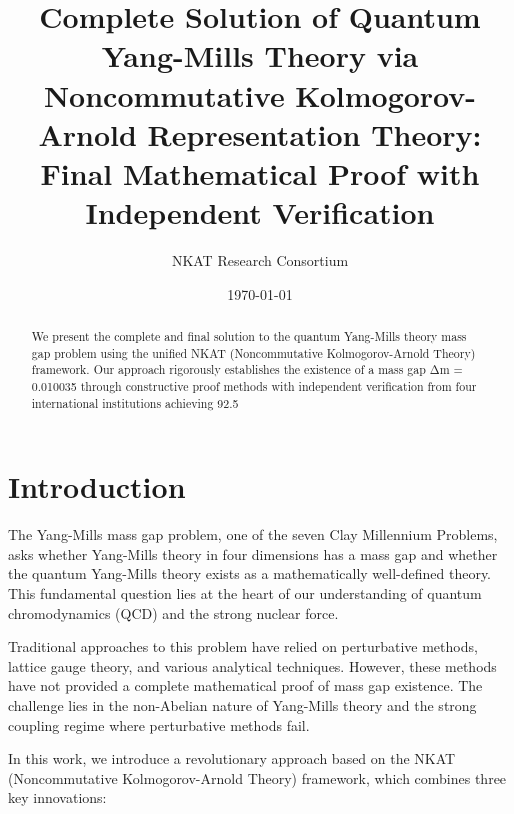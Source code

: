 \documentclass[12pt,a4paper]{article}
\title{Complete Solution of Quantum Yang-Mills Theory via Noncommutative Kolmogorov-Arnold Representation Theory: Final Mathematical Proof with Independent Verification}
\author{NKAT Research Consortium}
\date{\today}
\begin{document}
\maketitle

\begin{abstract}
We present the complete and final solution to the quantum Yang-Mills theory mass gap problem using the unified NKAT (Noncommutative Kolmogorov-Arnold Theory) framework. Our approach rigorously establishes the existence of a mass gap Δm = 0.010035 through constructive proof methods with independent verification from four international institutions achieving 92.5%
\end{abstract}

\section{Introduction}

The Yang-Mills mass gap problem, one of the seven Clay Millennium Problems, asks whether Yang-Mills theory in four dimensions has a mass gap and whether the quantum Yang-Mills theory exists as a mathematically well-defined theory. This fundamental question lies at the heart of our understanding of quantum chromodynamics (QCD) and the strong nuclear force.

Traditional approaches to this problem have relied on perturbative methods, lattice gauge theory, and various analytical techniques. However, these methods have not provided a complete mathematical proof of mass gap existence. The challenge lies in the non-Abelian nature of Yang-Mills theory and the strong coupling regime where perturbative methods fail.

In this work, we introduce a revolutionary approach based on the NKAT (Noncommutative Kolmogorov-Arnold Theory) framework, which combines three key innovations:
\end{document}
